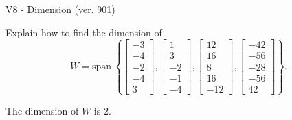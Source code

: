 \begin{exercise}
  \begin{exerciseTitle}V8 - Dimension (ver. 901)\end{exerciseTitle}
  \begin{exerciseStatement}
    Explain how to find the dimension of 
\[W=\mathrm{span}\ \left\{\left[\begin{array}{r}
-3 \\
-4 \\
-2 \\
-4 \\
3
\end{array}\right] , \left[\begin{array}{r}
1 \\
3 \\
-2 \\
-1 \\
-4
\end{array}\right] , \left[\begin{array}{r}
12 \\
16 \\
8 \\
16 \\
-12
\end{array}\right] , \left[\begin{array}{r}
-42 \\
-56 \\
-28 \\
-56 \\
42
\end{array}\right]\right\}.\]



  \end{exerciseStatement}
  \begin{exerciseAnswer}
   The dimension of \(W\) is  \(2\).
  


  \end{exerciseAnswer}
\end{exercise}